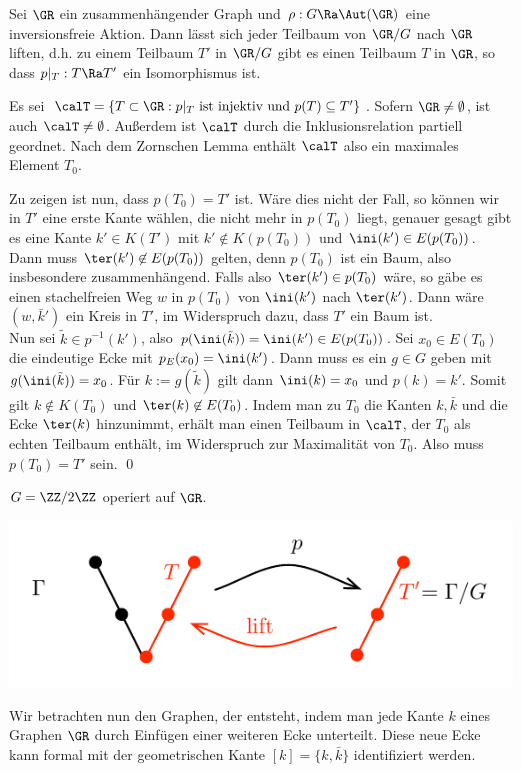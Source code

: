 \BEM\label{bem_lift}
Sei $\GR$ ein zusammenhängender Graph und $\rho:G\Ra\Aut(\GR)$
eine inversionsfreie Aktion.
Dann lässt sich jeder Teilbaum von $\GR/G$ nach $\GR$ liften,
d.h. zu einem Teilbaum $T'$ in $\GR/G$ gibt es einen Teilbaum $T$ in
$\GR$, so dass $p|_T:T\Ra T'$ ein Isomorphismus ist.

\bew Es sei
$\calT =\{ T \subset \GR : p|_T \text{ ist injektiv und } p(T)\subseteq T' \}$.
Sofern $\GR\neq\emptyset$, ist auch $\calT\neq\emptyset$.
Außerdem ist $\calT$ durch die Inklusionsrelation partiell geordnet.
Nach dem Zornschen Lemma enthält $\calT$ also ein maximales Element
$T_0$.

Zu zeigen ist nun, dass $p(T_0)=T'$ ist.
Wäre dies nicht der Fall, so können wir in $T'$ eine erste Kante
wählen, die nicht mehr in $p(T_0)$ liegt, genauer gesagt gibt es eine
Kante $k'\in K(T')$ mit $k'\not\in K(p(T_0))$ und
$\ini(k')\in E(p(T_0))$. Dann muss $\ter(k')\not\in E(p(T_0))$ gelten,
denn $p(T_0)$ ist ein Baum, also insbesondere zusammenhängend.
Falls also $\ter(k')\in p(T_0)$ wäre, so gäbe es einen stachelfreien
Weg $w$ in $p(T_0)$ von $\ini(k')$ nach $\ter(k')$.
Dann wäre $(w, \bar{k}')$ ein Kreis in $T'$, im Widerspruch dazu,
dass $T'$ ein Baum ist.\\
Nun sei $\tilde{k}\in p^{-1}(k')$, also
$p(\ini(\tilde{k}))=\ini(k') \in E(p(T_0))$.
Sei $x_0 \in E(T_0)$ die eindeutige Ecke mit $p_E(x_0)=\ini(k')$.
Dann muss es ein $g\in G$ geben mit $g(\ini(\tilde{k}))=x_0$.
Für $k:=g(\tilde{k})$ gilt dann $\ini(k)=x_0$ und $p(k)=k'$.
Somit gilt $k\not\in K(T_0)$ und $\ter(k)\not\in E(T_0)$.
Indem man zu $T_0$ die Kanten $k,\bar{k}$ und die Ecke $\ter(k)$
hinzunimmt, erhält man einen Teilbaum in $\calT$, der $T_0$ als
echten Teilbaum enthält, im Widerspruch zur Maximalität von $T_0$.
Also muss $p(T_0)=T'$ sein.
\qed

\BSP $G=\ZZ/2\ZZ$ operiert auf $\GR$.
\begin{center}
	\includegraphics{grugraImages/lift}
\end{center}

Wir betrachten nun den Graphen, der entsteht, indem man jede Kante $k$
eines Graphen $\GR$ durch Einfügen einer weiteren
Ecke unterteilt. Diese neue Ecke kann formal mit der geometrischen
Kante $[k]=\{k,\bar{k}\}$ identifiziert werden.


